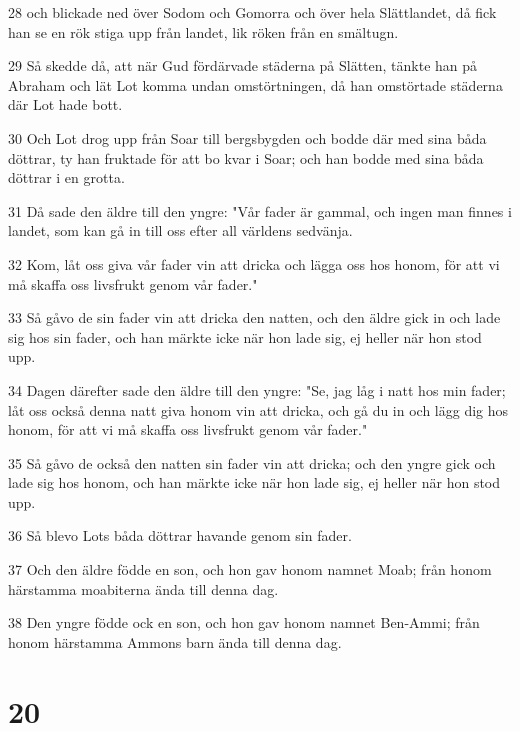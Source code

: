 \par 28 och blickade ned över Sodom och Gomorra och över hela Slättlandet, då fick han se en rök stiga upp från landet, lik röken från en smältugn.
\par 29 Så skedde då, att när Gud fördärvade städerna på Slätten, tänkte han på Abraham och lät Lot komma undan omstörtningen, då han omstörtade städerna där Lot hade bott.
\par 30 Och Lot drog upp från Soar till bergsbygden och bodde där med sina båda döttrar, ty han fruktade för att bo kvar i Soar; och han bodde med sina båda döttrar i en grotta.
\par 31 Då sade den äldre till den yngre: "Vår fader är gammal, och ingen man finnes i landet, som kan gå in till oss efter all världens sedvänja.
\par 32 Kom, låt oss giva vår fader vin att dricka och lägga oss hos honom, för att vi må skaffa oss livsfrukt genom vår fader."
\par 33 Så gåvo de sin fader vin att dricka den natten, och den äldre gick in och lade sig hos sin fader, och han märkte icke när hon lade sig, ej heller när hon stod upp.
\par 34 Dagen därefter sade den äldre till den yngre: "Se, jag låg i natt hos min fader; låt oss också denna natt giva honom vin att dricka, och gå du in och lägg dig hos honom, för att vi må skaffa oss livsfrukt genom vår fader."
\par 35 Så gåvo de också den natten sin fader vin att dricka; och den yngre gick och lade sig hos honom, och han märkte icke när hon lade sig, ej heller när hon stod upp.
\par 36 Så blevo Lots båda döttrar havande genom sin fader.
\par 37 Och den äldre födde en son, och hon gav honom namnet Moab; från honom härstamma moabiterna ända till denna dag.
\par 38 Den yngre födde ock en son, och hon gav honom namnet Ben-Ammi; från honom härstamma Ammons barn ända till denna dag.

\chapter{20}

